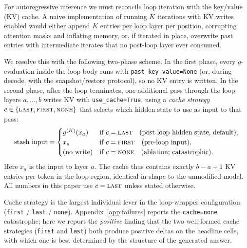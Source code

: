 For autoregressive inference \citep{vaswani2017attention} we must reconcile loop iteration with the key/value (KV) cache. A naive implementation of running $K$ iterations with KV writes enabled would either append $K$ entries per loop layer per position, corrupting attention masks and inflating memory, or, if iterated in place, overwrite past entries with intermediate iterates that no post-loop layer ever consumed.

We resolve this with the following two-phase scheme. In the first phase, every $g$-evaluation inside the loop body runs with \texttt{past\_key\_value=None} (or, during decode, with the snapshot/restore protocol), so no KV entry is written. In the second phase, after the loop terminates, one additional pass through the loop layers $a, \ldots, b$ writes KV with \texttt{use\_cache=True}, using a \emph{cache strategy} $c \in \{\textsc{last}, \textsc{first}, \textsc{none}\}$ that selects which hidden state to use as input to that pass:
\begin{equation}
\text{stash input} =
\begin{cases}
g^{(K)}(x_a) & \text{if } c = \textsc{last} \quad\text{(post-loop hidden state, default)},\\
x_a          & \text{if } c = \textsc{first} \quad\text{(pre-loop input)},\\
\text{(no write)} & \text{if } c = \textsc{none} \quad\text{(ablation; catastrophic)}.
\end{cases}
\label{eq:cache-strategy}
\end{equation}
Here $x_a$ is the input to layer $a$. The cache thus contains exactly $b - a + 1$ KV entries per token in the loop region, identical in shape to the unmodified model. All numbers in this paper use $c = \textsc{last}$ unless stated otherwise.

Cache strategy is the largest individual lever in the loop-wrapper configuration (\texttt{first} / \texttt{last} / \texttt{none}). Appendix~\ref{app:failures} reports the \texttt{cache=none} catastrophe; here we report the \emph{positive} finding that the two well-formed cache strategies (\texttt{first} and \texttt{last}) both produce positive deltas on the headline cells, with which one is best determined by the structure of the generated answer.

